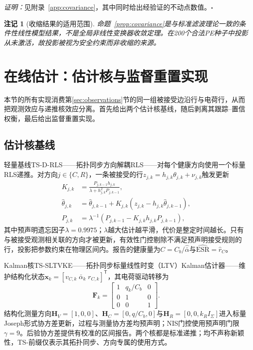 \documentclass[zihao=5,a4paper]{ctexart}
\newcommand{\ESR}{\ensuremath{\mathrm{ESR}}}
\newcommand{\TSRLS}{TS-D-RLS}
\newcommand{\TSKF}{TS-SLTVKE}
\newcommand{\alphab}{\bar{\alpha}}
\newcommand{\vect}[1]{\bm{#1}}
\newtheorem{remark}{注记}
\begin{document}
\emph{证明：}见附录~\ref{app:covariance}，其中同时给出经验证的不动点数值。\hfill$\square$

\begin{remark}[收缩结果的适用范围]
\label{rem:contraction_scope}
命题~\ref{prop:covariance}是与标准滤波理论\cite{jazwinski1970filtering,anderson1979optimal}一致的条件性线性模型结果，不是全局非线性变换器收敛定理。在200个合法PE种子中投影从未激活，故投影被视为安全约束而非收缩的来源。
\end{remark}

\section{在线估计：估计核与监督重置实现}
\label{sec:estimators}

本节的所有实现消费第\ref{sec:observations}节的同一组被接受边沿行与电荷行，从而把观测效应与递推核效应分离。首先给出两个估计核基线，随后剥离其跟踪--置信权衡，最后给出监督重置实现。

\subsection{估计核基线}
\label{sec:kernels}

轻量基线\TSRLS{}——拓扑同步方向解耦RLS——对每个健康方向使用一个标量RLS递推。对方向$j\in\{C,R\}$，一条被接受的行$z_{j,k}=h_{j,k}\theta_{j,k}+\nu_{j,k}$触发更新
\begin{align}
K_{j,k}&=\frac{P_{j,k-1}h_{j,k}}
{\lambda+h_{j,k}^{2}P_{j,k-1}},
\label{eq:rls_gain}\\
\hat\theta_{j,k}&=\hat\theta_{j,k-1}
+K_{j,k}(z_{j,k}-h_{j,k}\hat\theta_{j,k-1}),
\label{eq:rls_state}\\
P_{j,k}&=\lambda^{-1}(P_{j,k-1}-K_{j,k}h_{j,k}P_{j,k-1}),
\label{eq:rls_cov}
\end{align}
其中预声明遗忘因子$\lambda=0.9975$；$\lambda$越大估计越平滑，代价是整定时间越长。只有与被接受观测相关联的方向才被更新，有效性门控剔除不满足预声明接受规则的行，投影把参数约束在物理区间内。报告的健康量为$\hat C=C_b/\hat\alphab$与$\widehat{\ESR}=\hat r_C$。

Kalman核\TSKF{}——拓扑同步标量线性时变（LTV）Kalman估计器——维护结构化状态$\vect{x}_k=[v_{C,k}\;\alphab_k\;r_{C,k}]^{\mathsf T}$，其电荷驱动转移为
\begin{equation}
\vect{F}_k=
\begin{bmatrix}
1&q_k/C_b&0\\0&1&0\\0&0&1
\end{bmatrix}.
\label{eq:kf_transition}
\end{equation}
结构化测量方向$\vect{H}_V=[1,0,0]$、$\vect{H}_C=[0,q/C_b,0]$与$\vect{H}_R=[0,0,k_RI_\Sigma]$进入标量Joseph形式协方差更新，过程与测量协方差均预声明；NIS门控使用预声明门限$\gamma=9$。后验协方差提供有校准的区间报告。两个核都是标准递推\cite{jazwinski1970filtering,anderson1979optimal}；均不声称新颖性，TS-前缀仅表示其拓扑同步、方向专属的使用方式。
\end{document}
